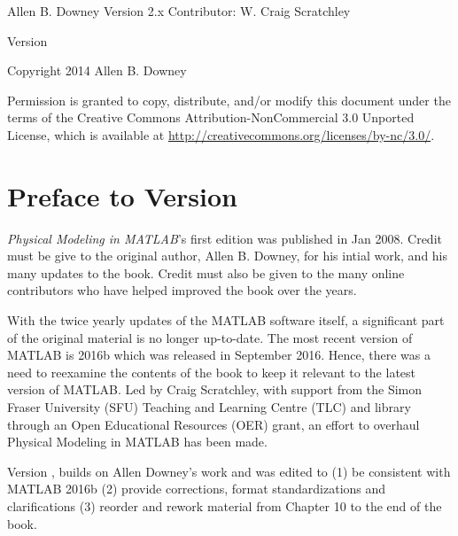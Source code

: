\documentclass{book}
\begin{document}

\begin{htmlonly}


{\Large \thetitle}

{\large Allen B. Downey}
{\large Version 2.x Contributor:  W. Craig Scratchley}

Version \theversion

Copyright 2014 Allen B. Downey

\vspace{0.25in}

Permission is granted to copy, distribute, and/or modify this document
under the terms of the Creative Commons Attribution-NonCommercial 3.0
Unported License, which is available at
\url{http://creativecommons.org/licenses/by-nc/3.0/}.

\setcounter{chapter}{-1}

\end{htmlonly}
\chapter {Preface to Version \theversion}
 {\itshape Physical Modeling in MATLAB}'s first edition was published in Jan 2008. Credit must be give to the original author, Allen B. Downey, for his intial work, and his many updates to the book. Credit must also be given to the many online contributors who have helped improved the book over the years.

 With the twice yearly updates of the MATLAB software itself, a significant part of the original material is no longer up-to-date. The most recent version of MATLAB is 2016b which was released in September 2016. Hence, there was a need to reexamine the contents of the book to keep it relevant to the latest version of MATLAB. Led by Craig Scratchley, with support from the Simon Fraser University (SFU) Teaching and Learning Centre (TLC) and library through an Open Educational Resources (OER) grant, an effort to overhaul Physical Modeling in MATLAB has been made. 

 Version \theversion , builds on Allen Downey's work and was edited to (1) be consistent with MATLAB 2016b  (2) provide corrections, format standardizations and clarifications  (3) reorder and rework material from Chapter 10 to the end of the book.

\end{document}
